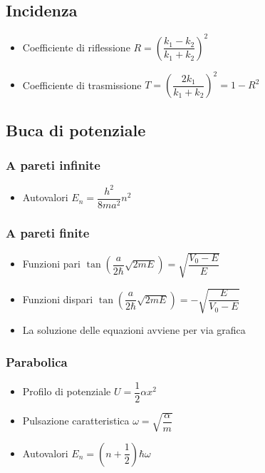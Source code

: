 \documentclass{article}
\begin{document}
\subsection{Incidenza} 
\begin{itemize}
	\item Coefficiente di riflessione \( R = \left( \dfrac{k_1 - k_2}{k_1 + k_2} \right) ^ 2 \)
	\item Coefficiente di trasmissione \( T = \left( \dfrac{2 k_1}{k_1 + k_2} \right) ^ 2 = 1 - R ^ 2 \)
\end{itemize}

\subsection{Buca di potenziale}

\subsubsection{A pareti infinite}
\begin{itemize}
	\item Autovalori \( E_n = \dfrac{h^2}{8 m a ^2} n^2 \)
\end{itemize}

\subsubsection{A pareti finite}
\begin{itemize}
	\item Funzioni pari \( \tan\left( \dfrac{a}{2 \hbar} \sqrt{2mE} \right) = \sqrt{\dfrac{V_0 - E}{E}} \)
	\item Funzioni dispari \( \tan\left( \dfrac{a}{2 \hbar} \sqrt{2mE} \right) = - \sqrt{\dfrac{E}{V_0 - E}} \)
	\item La soluzione delle equazioni avviene per via grafica
\end{itemize} 

\subsubsection{Parabolica}
\begin{itemize}
	\item Profilo di potenziale \(U = \dfrac{1}{2} \alpha x ^ 2 \)
	\item Pulsazione caratteristica \( \omega = \sqrt{\dfrac{\alpha}{m}} \)
	\item Autovalori \( E_n = ( n + \dfrac{1}{2} ) \hbar \omega \)
\end{itemize}
\end{document}
